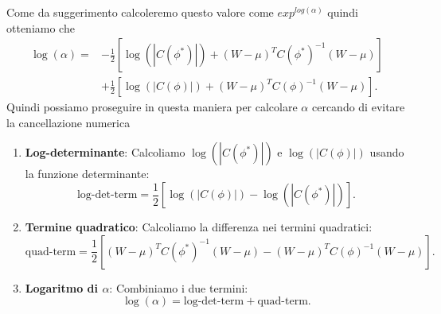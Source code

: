 \documentclass[a4paper,12pt]{article}
\begin{document}
\begin{itemize}
\begin{itemize}
			Come da suggerimento calcoleremo questo valore come $exp^{log(\alpha)}$ quindi otteniamo che
			\begin{align*}
				\log(\alpha) = 
				& -\frac{1}{2} \left[ \log(|C(\phi^*)|) + (W - \mu)^T C(\phi^*)^{-1} (W - \mu) \right] \\
				& + \frac{1}{2} \left[ \log(|C(\phi)|) + (W - \mu)^T C(\phi)^{-1} (W - \mu) \right].
			\end{align*}
			Quindi possiamo proseguire in questa maniera per calcolare $\alpha$ cercando di evitare la cancellazione numerica
			\begin{enumerate}
				\item \textbf{Log-determinante}: Calcoliamo $\log(|C(\phi^*)|)$ e $\log(|C(\phi)|)$ usando la funzione determinante:
				\[
				\text{log-det-term} = \frac{1}{2} \left[ \log(|C(\phi)|) - \log(|C(\phi^*)|) \right].
				\]
				
				\item \textbf{Termine quadratico}: Calcoliamo la differenza nei termini quadratici:
				\[
				\text{quad-term} = \frac{1}{2} \left[ (W - \mu)^T C(\phi^*)^{-1} (W - \mu) - (W - \mu)^T C(\phi)^{-1} (W - \mu) \right].
				\]
				
				\item \textbf{Logaritmo di $\alpha$}: Combiniamo i due termini:
				\[
				\log(\alpha) = \text{log-det-term} + \text{quad-term}.
				\]
				

\end{enumerate}
\end{itemize}
\end{itemize}
\end{document}
